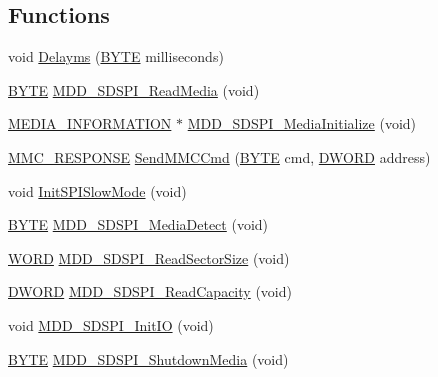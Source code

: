 \subsection*{Functions}
\begin{DoxyCompactItemize}
\item 
void \hyperlink{_s_d-_s_p_i_8c_a5051d074e6b2361e58b3ea5585443e25}{Delayms} (\hyperlink{_generic_type_defs_8h_a4ae1dab0fb4b072a66584546209e7d58}{B\+Y\+T\+E} milliseconds)
\item 
\hyperlink{_generic_type_defs_8h_a4ae1dab0fb4b072a66584546209e7d58}{B\+Y\+T\+E} \hyperlink{_s_d-_s_p_i_8c_a4990e32f9f0abd51bb486f148ab98875}{M\+D\+D\+\_\+\+S\+D\+S\+P\+I\+\_\+\+Read\+Media} (void)
\item 
\hyperlink{struct_m_e_d_i_a___i_n_f_o_r_m_a_t_i_o_n}{M\+E\+D\+I\+A\+\_\+\+I\+N\+F\+O\+R\+M\+A\+T\+I\+O\+N} $\ast$ \hyperlink{_s_d-_s_p_i_8c_a399249708046e5c18471a82c2e8119ab}{M\+D\+D\+\_\+\+S\+D\+S\+P\+I\+\_\+\+Media\+Initialize} (void)
\item 
\hyperlink{union_m_m_c___r_e_s_p_o_n_s_e}{M\+M\+C\+\_\+\+R\+E\+S\+P\+O\+N\+S\+E} \hyperlink{_s_d-_s_p_i_8c_a88d057eb424e5ae206be5465387b2e0a}{Send\+M\+M\+C\+Cmd} (\hyperlink{_generic_type_defs_8h_a4ae1dab0fb4b072a66584546209e7d58}{B\+Y\+T\+E} cmd, \hyperlink{_generic_type_defs_8h_ad342ac907eb044443153a22f964bf0af}{D\+W\+O\+R\+D} address)
\item 
void \hyperlink{_s_d-_s_p_i_8c_abb14b787d26043d7597171c47429dcef}{Init\+S\+P\+I\+Slow\+Mode} (void)
\item 
\hyperlink{_generic_type_defs_8h_a4ae1dab0fb4b072a66584546209e7d58}{B\+Y\+T\+E} \hyperlink{_s_d-_s_p_i_8c_a30887940b056f7563f2c31cfdc9b9527}{M\+D\+D\+\_\+\+S\+D\+S\+P\+I\+\_\+\+Media\+Detect} (void)
\item 
\hyperlink{_generic_type_defs_8h_a2b0e863dadf920709ec53d9088ee7c91}{W\+O\+R\+D} \hyperlink{_s_d-_s_p_i_8c_a20a071eb0f4d5fdcd574d4c359686d71}{M\+D\+D\+\_\+\+S\+D\+S\+P\+I\+\_\+\+Read\+Sector\+Size} (void)
\item 
\hyperlink{_generic_type_defs_8h_ad342ac907eb044443153a22f964bf0af}{D\+W\+O\+R\+D} \hyperlink{_s_d-_s_p_i_8c_abf7ff1b0a96625e8108c47957de8d46d}{M\+D\+D\+\_\+\+S\+D\+S\+P\+I\+\_\+\+Read\+Capacity} (void)
\item 
void \hyperlink{_s_d-_s_p_i_8c_aa57c9a50f2928e5fa73b694820d0b9ee}{M\+D\+D\+\_\+\+S\+D\+S\+P\+I\+\_\+\+Init\+I\+O} (void)
\item 
\hyperlink{_generic_type_defs_8h_a4ae1dab0fb4b072a66584546209e7d58}{B\+Y\+T\+E} \hyperlink{_s_d-_s_p_i_8c_a8f03681bf00e9f6d8f31581f55ad7c1d}{M\+D\+D\+\_\+\+S\+D\+S\+P\+I\+\_\+\+Shutdown\+Media} (void)

\end{DoxyCompactItemize}
